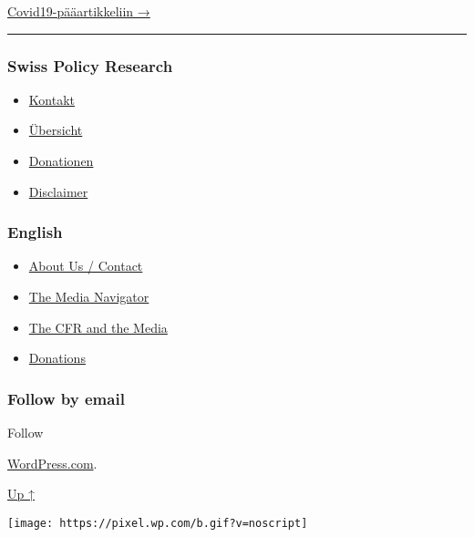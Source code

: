 \href{https://swprs.org/faktoja-covid-19sta/}{Covid19-pääartikkeliin →}

\begin{center}\rule{0.5\linewidth}{\linethickness}\end{center}

\hypertarget{swiss-policy-research}{%
\subsubsection{Swiss Policy Research}\label{swiss-policy-research}}

\begin{itemize}
\tightlist
\item
  \href{https://swprs.org/kontakt/}{Kontakt}
\item
  \href{https://swprs.org/uebersicht/}{Übersicht}
\item
  \href{https://swprs.org/donationen/}{Donationen}
\item
  \href{https://swprs.org/disclaimer/}{Disclaimer}
\end{itemize}

\hypertarget{english}{%
\subsubsection{English}\label{english}}

\begin{itemize}
\tightlist
\item
  \href{https://swprs.org/contact/}{About Us / Contact}
\item
  \href{https://swprs.org/media-navigator/}{The Media Navigator}
\item
  \href{https://swprs.org/the-american-empire-and-its-media/}{The CFR
  and the Media}
\item
  \href{https://swprs.org/donations/}{Donations}
\end{itemize}

\hypertarget{follow-by-email}{%
\subsubsection{Follow by email}\label{follow-by-email}}

Follow

\href{https://wordpress.com/?ref=footer_custom_com}{WordPress.com}.

\protect\hyperlink{}{Up ↑}

\texttt{[image: https://pixel.wp.com/b.gif?v=noscript]}
